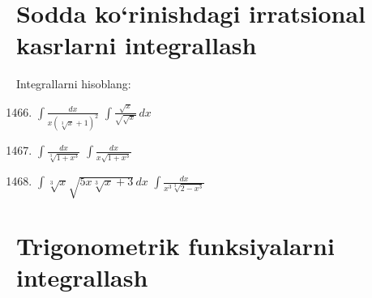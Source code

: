 \section{Sodda ko`rinishdagi irratsional kasrlarni integrallash}


Integrallarni hisoblang:
\begin{enumerate}\setcounter{enumi}{1465}
	\item $\int\frac{dx}{x\left(\sqrt[3]{x}+1\right)^2}$
	\inlineitem $\int\frac{\sqrt{x}}{\sqrt{\sqrt{x}}}\,dx$
	
	\item $\int\frac{dx}{\sqrt[3]{1+x^3}}$
	\inlineitem $\int\frac{dx}{x\sqrt{1+x^3}}$
	
	\item $\int\sqrt[3]{x}\sqrt{5x\sqrt[3]{x}+3}\,dx$
	\inlineitem $\int\frac{dx}{x^3\sqrt[3]{2-x^3}}$
	
\end{enumerate}
\section{Trigonometrik funksiyalarni integrallash}
\hspace{0.6cm}


